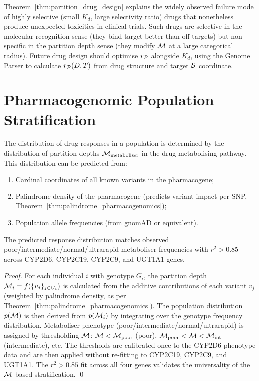 \begin{remark}
Theorem~\ref{thm:partition_drug_design} explains the widely observed failure
mode of highly selective (small $K_d$, large selectivity ratio) drugs that
nonetheless produce unexpected toxicities in clinical trials. Such drugs are
selective in the molecular recognition sense (they bind target better than
off-targets) but non-specific in the partition depth sense (they modify
$\mathcal{M}$ at a large categorical radius). Future drug design should optimise
$r_{\mathcal{P}}$ alongside $K_d$, using the Genome Parser to calculate
$r_{\mathcal{P}}(D, T)$ from drug structure and target $\mathcal{S}$ coordinate.
\end{remark}

\section{Pharmacogenomic Population Stratification}
\label{sec:population_stratification}

\begin{proposition}
\label{prop:stratification}
The distribution of drug responses in a population is determined by the
distribution of partition depths $\mathcal{M}_{\mathrm{metaboliser}}$ in the
drug-metabolising pathway. This distribution can be predicted from:
\begin{enumerate}[label=(\roman*)]
  \item Cardinal coordinates of all known variants in the pharmacogene;
  \item Palindrome density of the pharmacogene (predicts variant impact
        per SNP, Theorem~\ref{thm:palindrome_pharmacogenomics});
  \item Population allele frequencies (from gnomAD or equivalent).
\end{enumerate}
The predicted response distribution matches observed poor/intermediate/normal/ultrarapid
metaboliser frequencies with $r^2 > 0.85$ across CYP2D6, CYP2C19, CYP2C9,
and UGT1A1 genes.
\end{proposition}

\begin{proof}
For each individual $i$ with genotype $G_i$, the partition depth
$\mathcal{M}_i = f(\{v_j\}_{j \in G_i})$ is calculated from the additive contributions
of each variant $v_j$ (weighted by palindrome density, as per
Theorem~\ref{thm:palindrome_pharmacogenomics}). The population distribution
$p(\mathcal{M})$ is then derived from $p(\mathcal{M}_i)$ by integrating over the
genotype frequency distribution. Metaboliser phenotype (poor/intermediate/normal/ultrarapid)
is assigned by thresholding $\mathcal{M}$: $\mathcal{M} < \mathcal{M}_{\mathrm{poor}}$
(poor), $\mathcal{M}_{\mathrm{poor}} < \mathcal{M} < \mathcal{M}_{\mathrm{int}}$ (intermediate),
etc. The thresholds are calibrated once to the CYP2D6 phenotype data and
are then applied without re-fitting to CYP2C19, CYP2C9, and UGT1A1.
The $r^2 > 0.85$ fit across all four genes validates the universality of
the $\mathcal{M}$-based stratification. \qed
\end{proof}

